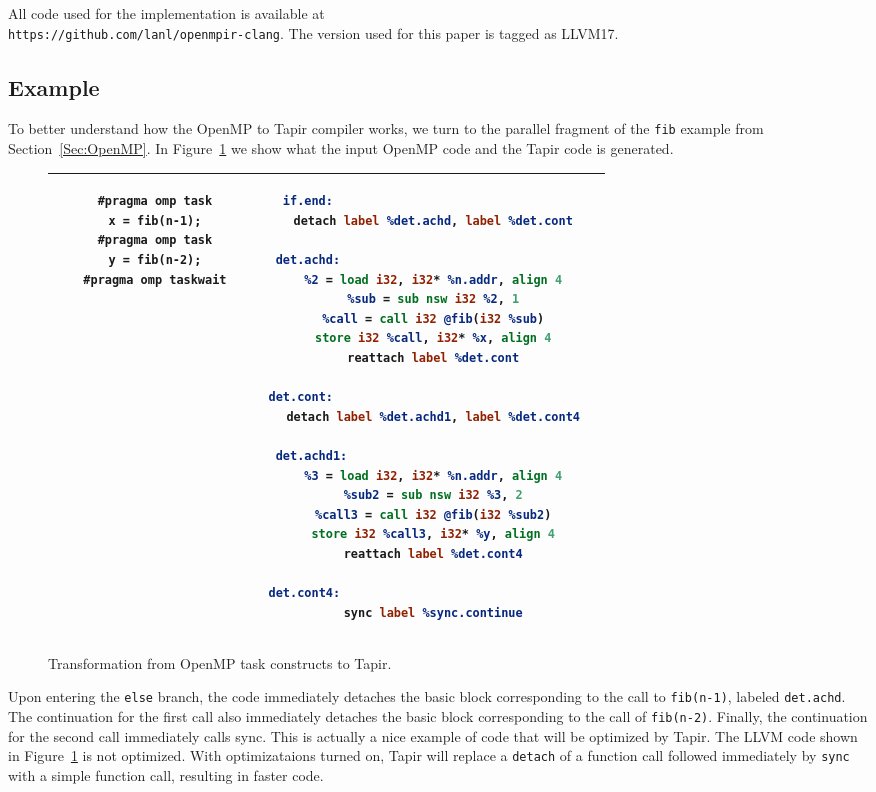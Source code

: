 \documentclass[sigconf]{acmart}
\newcommand{\figref}[1]         {Figure~\ref{fig:#1}}
\begin{document}
All code used for the implementation is available at \\
\texttt{https://github.com/lanl/openmpir-clang}. The version used for this
paper is tagged as LLVM17.

\subsection{Example} \label{Sec:Example}

To better understand how the OpenMP to Tapir compiler works, we turn to the
parallel fragment of the \texttt{fib} example from Section~\ref{Sec:OpenMP}. In
Figure~\ref{fig:tapir-example} we show what the input OpenMP code and the Tapir code
is generated.

\begin{figure}
\begin{tabular}{| c c c | c c c |}
\hline
 & 
\begin{lstlisting}
  #pragma omp task
    x = fib(n-1);  
  #pragma omp task
    y = fib(n-2);  
  #pragma omp taskwait
\end{lstlisting}
& & &
\begin{lstlisting}[language=llvm]
if.end:                                 
  detach label %det.achd, label %det.cont

det.achd:                                 
  %2 = load i32, i32* %n.addr, align 4
  %sub = sub nsw i32 %2, 1
  %call = call i32 @fib(i32 %sub)
  store i32 %call, i32* %x, align 4
  reattach label %det.cont

det.cont:                                   
  detach label %det.achd1, label %det.cont4

det.achd1:                                
  %3 = load i32, i32* %n.addr, align 4
  %sub2 = sub nsw i32 %3, 2
  %call3 = call i32 @fib(i32 %sub2)
  store i32 %call3, i32* %y, align 4
  reattach label %det.cont4

det.cont4:                                  
  sync label %sync.continue
\end{lstlisting}
 & \\
\hline
\end{tabular}
\caption{Transformation from OpenMP task constructs to Tapir.}
\label{fig:tapir-example}
\end{figure}

Upon entering the \texttt{else} branch, the code immediately detaches the basic
block corresponding to the call to \texttt{fib(n-1)}, labeled
\texttt{det.achd}. The continuation for the first call also immediately
detaches the basic block corresponding to the call of \texttt{fib(n-2)}.
Finally, the continuation for the second call immediately calls sync. This is
actually a nice example of code that will be optimized by Tapir. The LLVM code
shown in \figref{tapir-example} is not optimized. With optimizataions turned
on, Tapir will replace a \texttt{detach} of a function call followed
immediately by \texttt{sync} with a simple function call, resulting in faster
code. 
\end{document}
